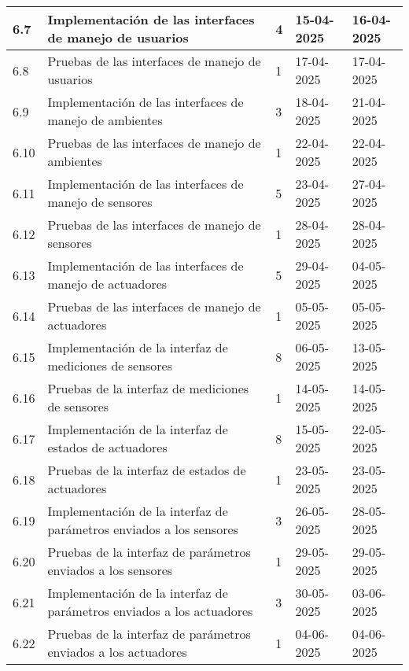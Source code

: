 \begin{table}[ht]
\begin{tabularx}{\linewidth}{|p{1cm}|p{10cm}|p{1cm}|p{1.8cm}|p{1.8cm}|}
		6.7   & Implementación de las interfaces de manejo de usuarios                & 4     & 15-04-2025 & 16-04-2025 \\ \hline
		6.8   & Pruebas de las interfaces de manejo de usuarios                       & 1     & 17-04-2025 & 17-04-2025 \\ \hline
		6.9   & Implementación de las interfaces de manejo de ambientes               & 3     & 18-04-2025 & 21-04-2025 \\ \hline
		6.10  & Pruebas de las interfaces de manejo de ambientes                      & 1     & 22-04-2025 & 22-04-2025 \\ \hline
		6.11  & Implementación de las interfaces de manejo de sensores                & 5     & 23-04-2025 & 27-04-2025 \\ \hline
		6.12  & Pruebas de las interfaces de manejo de sensores                       & 1     & 28-04-2025 & 28-04-2025 \\ \hline
		6.13  & Implementación de las interfaces de manejo de actuadores              & 5     & 29-04-2025 & 04-05-2025 \\ \hline
		6.14  & Pruebas de las interfaces de manejo de actuadores                     & 1     & 05-05-2025 & 05-05-2025 \\ \hline
		6.15  & Implementación de la interfaz de mediciones de sensores               & 8     & 06-05-2025 & 13-05-2025 \\ \hline
		6.16  & Pruebas de la interfaz de mediciones de sensores                      & 1     & 14-05-2025 & 14-05-2025 \\ \hline
		6.17  & Implementación de la interfaz de estados de actuadores                & 8     & 15-05-2025 & 22-05-2025 \\ \hline
		6.18  & Pruebas de la interfaz de estados de actuadores                       & 1     & 23-05-2025 & 23-05-2025 \\ \hline
		6.19  & Implementación de la interfaz de parámetros enviados a los sensores   & 3     & 26-05-2025 & 28-05-2025 \\ \hline
		6.20  & Pruebas de la interfaz de parámetros enviados a los sensores          & 1     & 29-05-2025 & 29-05-2025 \\ \hline
		6.21  & Implementación de la interfaz de parámetros enviados a los actuadores & 3     & 30-05-2025 & 03-06-2025 \\ \hline
		6.22  & Pruebas de la interfaz de parámetros enviados a los actuadores        & 1     & 04-06-2025 & 04-06-2025 \\ \hline

\end{tabularx}
\end{table}
